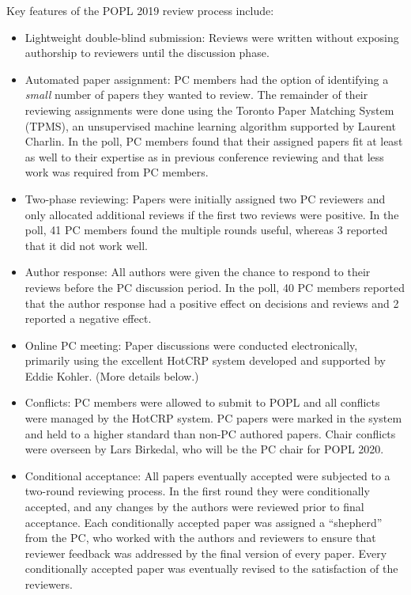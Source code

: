 Key features of the POPL 2019 review process include:
\begin{itemize}
\item Lightweight double-blind submission: Reviews were written without
  exposing authorship to reviewers until the discussion phase.
\item Automated paper assignment: PC members had the option of identifying a
  \emph{small} number of papers they wanted to review. The
  remainder of their reviewing assignments were done using the Toronto Paper
  Matching System (TPMS), an unsupervised machine learning algorithm supported
  by Laurent Charlin. In the poll, PC members found that their assigned
  papers fit at least as well to their expertise as in previous conference
  reviewing and that less work was required from PC members.
\item Two-phase reviewing: Papers were initially assigned two PC reviewers
  and only allocated additional reviews if the first two reviews were
  positive. In the poll, 41 PC members found the multiple rounds
  useful, whereas 3 reported that it did not work well.
\item Author response: All authors were given the chance to respond to their
  reviews before the PC discussion period. In the poll, 40 PC members
  reported that the author response had a positive effect on decisions and
  reviews and 2 reported a negative effect.
\item Online PC meeting: Paper discussions were conducted electronically,
  primarily using the excellent HotCRP system developed and supported by Eddie
  Kohler. (More details below.)
\item Conflicts: PC members were allowed to submit to POPL and all conflicts
  were managed by the HotCRP system. PC papers were marked in the system and
  held to a higher standard than non-PC authored papers. Chair conflicts were
  overseen by Lars Birkedal, who will be the PC chair for POPL 2020.
\item Conditional acceptance: All papers eventually accepted were subjected 
  to a two-round reviewing process.  In the first round they were
  conditionally accepted, and any changes by the authors were reviewed prior to
  final acceptance. Each conditionally accepted paper was assigned a ``shepherd''
  from the PC, who worked with the authors and reviewers to ensure that
  reviewer feedback was addressed by the final version of every paper. Every
  conditionally accepted paper was eventually revised to the satisfaction of
  the reviewers.
\end{itemize}

